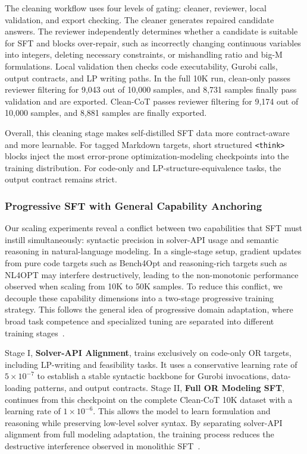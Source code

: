 The cleaning workflow uses four levels of gating: cleaner, reviewer, local validation, and export checking. The cleaner generates repaired candidate answers. The reviewer independently determines whether a candidate is suitable for SFT and blocks over-repair, such as incorrectly changing continuous variables into integers, deleting necessary constraints, or mishandling ratio and big-M formulations. Local validation then checks code executability, Gurobi calls, output contracts, and LP writing paths. In the full 10K run, clean-only passes reviewer filtering for 9,043 out of 10,000 samples, and 8,731 samples finally pass validation and are exported. Clean-CoT passes reviewer filtering for 9,174 out of 10,000 samples, and 8,881 samples are finally exported.

Overall, this cleaning stage makes self-distilled SFT data more contract-aware and more learnable. For tagged Markdown targets, short structured \texttt{<think>} blocks inject the most error-prone optimization-modeling checkpoints into the training distribution. For code-only and LP-structure-equivalence tasks, the output contract remains strict.

\subsubsection{Progressive SFT with General Capability Anchoring}

Our scaling experiments reveal a conflict between two capabilities that SFT must instill simultaneously: syntactic precision in solver-API usage and semantic reasoning in natural-language modeling. In a single-stage setup, gradient updates from pure code targets such as Bench4Opt and reasoning-rich targets such as NL4OPT may interfere destructively, leading to the non-monotonic performance observed when scaling from 10K to 50K samples. To reduce this conflict, we decouple these capability dimensions into a two-stage progressive training strategy. This follows the general idea of progressive domain adaptation, where broad task competence and specialized tuning are separated into different training stages~\citep{zhang2025adept}.

Stage I, \textbf{Solver-API Alignment}, trains exclusively on code-only OR targets, including LP-writing and feasibility tasks. It uses a conservative learning rate of \(5\times 10^{-7}\) to establish a stable syntactic backbone for Gurobi invocations, data-loading patterns, and output contracts. Stage II, \textbf{Full OR Modeling SFT}, continues from this checkpoint on the complete Clean-CoT 10K dataset with a learning rate of \(1\times 10^{-6}\). This allows the model to learn formulation and reasoning while preserving low-level solver syntax. By separating solver-API alignment from full modeling adaptation, the training process reduces the destructive interference observed in monolithic SFT~\citep{yildiz2024investigating}.

